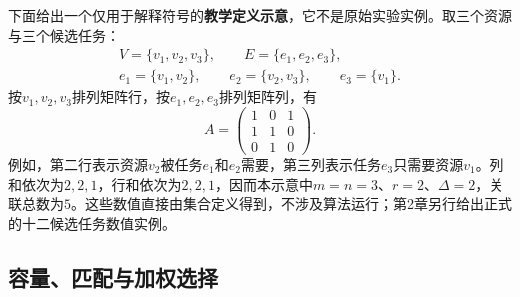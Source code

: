 下面给出一个仅用于解释符号的\textbf{教学定义示意}，它不是原始实验实例。取三个资源与三个候选任务：
\begin{equation}
 \begin{gathered}
 V=\{v_1,v_2,v_3\},\qquad E=\{e_1,e_2,e_3\},\\
 e_1=\{v_1,v_2\},\qquad
 e_2=\{v_2,v_3\},\qquad
 e_3=\{v_1\}.
 \end{gathered}
 \label{s0102:illustrative_sets}
\end{equation}
按$v_1,v_2,v_3$排列矩阵行，按$e_1,e_2,e_3$排列矩阵列，有
\begin{equation}
 A=\begin{pmatrix}
 1&0&1\\
 1&1&0\\
 0&1&0
 \end{pmatrix}.
 \label{s0102:illustrative_matrix}
\end{equation}
例如，第二行表示资源$v_2$被任务$e_1$和$e_2$需要，第三列表示任务$e_3$只需要资源$v_1$。列和依次为$2,2,1$，行和依次为$2,2,1$，因而本示意中$m=n=3$、$r=2$、$\Delta=2$，关联总数为$5$。这些数值直接由集合定义得到，不涉及算法运行；第2章另行给出正式的十二候选任务数值实例。

\subsection{容量、匹配与加权选择}

